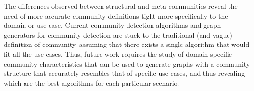 The differences observed between structural and meta-communities reveal the need
of more accurate community definitions tight more specifically to the domain or
use case. Current community detection algorithms and graph generators for
community detection are stuck to the traditional (and vague) definition of
community, assuming that there exists a single algorithm that would fit all the
use cases. Thus, future work requires the study of domain-specific community
characteristics that can be used to generate graphs with a community structure
that accurately resembles that of specific use cases, and thus revealing which
are the best algorithms for each particular scenario.

